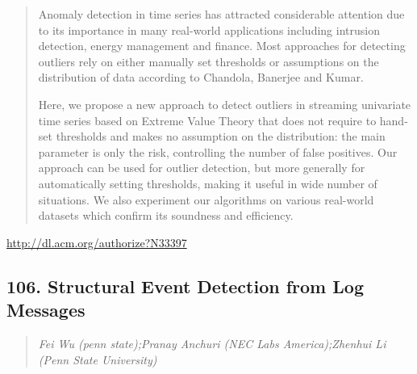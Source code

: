 \documentclass{article}
\begin{document}
\begin{quote}
Anomaly detection in time series has attracted considerable attention due to its importance in many real-world applications including intrusion detection, energy management and finance. Most approaches for detecting outliers rely on either manually set thresholds or assumptions on the distribution of data according to Chandola, Banerjee and Kumar.







  Here, we propose a new approach to detect outliers in streaming univariate time series based on Extreme Value Theory that does not require to hand-set thresholds and makes no assumption on the distribution: the main parameter is only the risk, controlling the number of false positives. Our approach can be used for outlier detection, but more generally for automatically setting thresholds, making it useful in wide number of situations. We also experiment our algorithms on various real-world datasets which confirm its soundness and efficiency.
\end{quote}

\href{http://dl.acm.org/authorize?N33397}{http://dl.acm.org/authorize?N33397}

\subsection{106. Structural Event Detection from Log Messages}

\begin{quote}
\footnotesize{\textit{Fei Wu (penn state);Pranay Anchuri (NEC Labs America);Zhenhui Li (Penn State University)}}

\end{quote}
\end{document}
